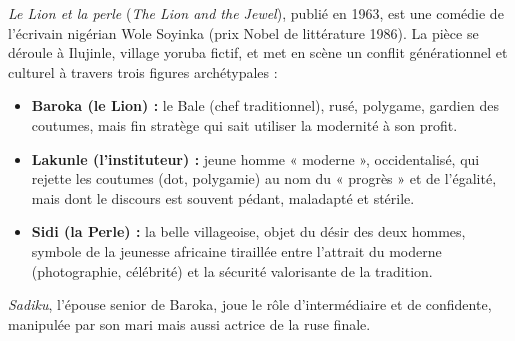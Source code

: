 \documentclass[11pt]{article}
\begin{document}
\begin{definition}
\emph{Le Lion et la perle} (\emph{The Lion and the Jewel}), publié en 1963, est une comédie de l'écrivain nigérian Wole Soyinka (prix Nobel de littérature 1986). La pièce se déroule à Ilujinle, village yoruba fictif, et met en scène un conflit générationnel et culturel à travers trois figures archétypales :
\begin{itemize}
    \item \textbf{Baroka (le Lion) :} le Bale (chef traditionnel), rusé, polygame, gardien des coutumes, mais fin stratège qui sait utiliser la modernité à son profit.
    \item \textbf{Lakunle (l'instituteur) :} jeune homme « moderne », occidentalisé, qui rejette les coutumes (dot, polygamie) au nom du « progrès » et de l'égalité, mais dont le discours est souvent pédant, maladapté et stérile.
    \item \textbf{Sidi (la Perle) :} la belle villageoise, objet du désir des deux hommes, symbole de la jeunesse africaine tiraillée entre l'attrait du moderne (photographie, célébrité) et la sécurité valorisante de la tradition.
\end{itemize}
\emph{Sadiku}, l'épouse senior de Baroka, joue le rôle d'intermédiaire et de confidente, manipulée par son mari mais aussi actrice de la ruse finale.
\end{definition}
\end{document}
